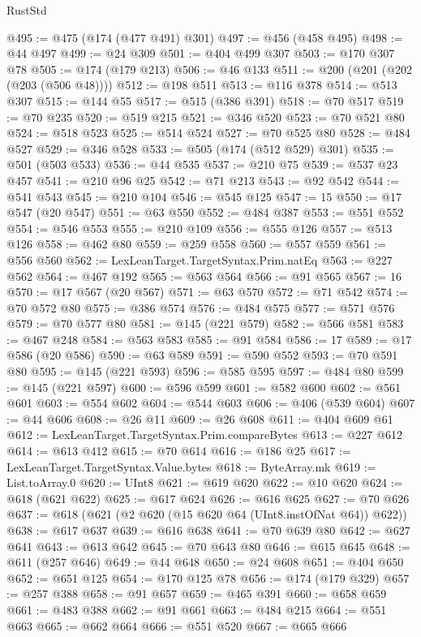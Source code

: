 \begin{lexlean}{RustStd}
\begin{coremodule}
@495 := @475 (@174 (@477 @491) @301)
@497 := @456 (@458 @495)
@498 := @44 @497
@499 := @24 @309
@501 := @404 @499 @307
@503 := @170 @307 @78
@505 := @174 (@179 @213)
@506 := @46 @133
@511 := @200 (@201 (@202 (@203 (@506 @48))))
@512 := @198 @511
@513 := @116 @378
@514 := @513 @307
@515 := @144 @55
@517 := @515 (@386 @391)
@518 := @70 @517
@519 := @70 @235
@520 := @519 @215
@521 := @346 @520
@523 := @70 @521 @80
@524 := @518 @523
@525 := @514 @524
@527 := @70 @525 @80
@528 := @484 @527
@529 := @346 @528
@533 := @505 (@174 (@512 @529) @301)
@535 := @501 (@503 @533)
@536 := @44 @535
@537 := @210 @75
@539 := @537 @23 @457
@541 := @210 @96 @25
@542 := @71 @213
@543 := @92 @542
@544 := @541 @543
@545 := @210 @104
@546 := @545 @125
@547 := 15
@550 := @17 @547 (@20 @547)
@551 := @63 @550
@552 := @484 @387
@553 := @551 @552
@554 := @546 @553
@555 := @210 @109
@556 := @555 @126
@557 := @513 @126
@558 := @462 @80
@559 := @259 @558
@560 := @557 @559
@561 := @556 @560
@562 := LexLeanTarget.TargetSyntax.Prim.natEq
@563 := @227 @562
@564 := @467 @192
@565 := @563 @564
@566 := @91 @565
@567 := 16
@570 := @17 @567 (@20 @567)
@571 := @63 @570
@572 := @71 @542
@574 := @70 @572 @80
@575 := @386 @574
@576 := @484 @575
@577 := @571 @576
@579 := @70 @577 @80
@581 := @145 (@221 @579)
@582 := @566 @581
@583 := @467 @248
@584 := @563 @583
@585 := @91 @584
@586 := 17
@589 := @17 @586 (@20 @586)
@590 := @63 @589
@591 := @590 @552
@593 := @70 @591 @80
@595 := @145 (@221 @593)
@596 := @585 @595
@597 := @484 @80
@599 := @145 (@221 @597)
@600 := @596 @599
@601 := @582 @600
@602 := @561 @601
@603 := @554 @602
@604 := @544 @603
@606 := @406 (@539 @604)
@607 := @44 @606
@608 := @26 @11
@609 := @26 @608
@611 := @404 @609 @61
@612 := LexLeanTarget.TargetSyntax.Prim.compareBytes
@613 := @227 @612
@614 := @613 @412
@615 := @70 @614
@616 := @186 @25
@617 := LexLeanTarget.TargetSyntax.Value.bytes
@618 := ByteArray.mk
@619 := List.toArray.{0}
@620 := UInt8
@621 := @619 @620
@622 := @10 @620
@624 := @618 (@621 @622)
@625 := @617 @624
@626 := @616 @625
@627 := @70 @626
@637 := @618 (@621 (@2 @620 (@15 @620 @64 (UInt8.instOfNat @64)) @622))
@638 := @617 @637
@639 := @616 @638
@641 := @70 @639 @80
@642 := @627 @641
@643 := @613 @642
@645 := @70 @643 @80
@646 := @615 @645
@648 := @611 (@257 @646)
@649 := @44 @648
@650 := @24 @608
@651 := @404 @650
@652 := @651 @125
@654 := @170 @125 @78
@656 := @174 (@179 @329)
@657 := @257 @388
@658 := @91 @657
@659 := @465 @391
@660 := @658 @659
@661 := @483 @388
@662 := @91 @661
@663 := @484 @215
@664 := @551 @663
@665 := @662 @664
@666 := @551 @520
@667 := @665 @666

\end{coremodule}
\end{lexlean}
